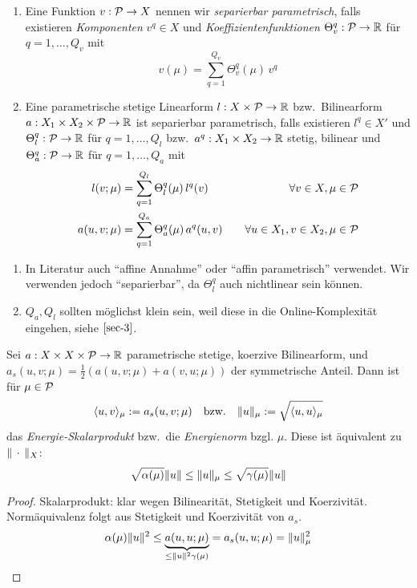 \begin{defn} \beginwithlist
	\begin{enumerate}
		\item Eine Funktion $v : \mathcal{P} \to X$ nennen wir \emph{separierbar parametrisch}, falls existieren \emph{Komponenten} $v^q \in X$ und \emph{Koeffizientenfunktionen} $\Theta_v^q : \mathcal{P} \to \mathbb{R}$ für $q = 1,\dots,Q_v$ mit
			\[
				v(\mu) = \sum_{q=1}^{Q_v} \Theta_v^q(\mu) \, v^q
			\]
		\item Eine parametrische stetige Linearform $l : X \times \mathcal{P} \to \mathbb{R}$ bzw.\ Bilinearform $a : X_1 \times X_2 \times \mathcal{P} \to \mathbb{R}$ ist separierbar parametrisch, falls existieren $l^q \in X'$ und $\Theta_l^q : \mathcal{P} \to \mathbb{R}$ für $q = 1,\dots,Q_l$ bzw.\ $a^q : X_1 \times X_2 \to \mathbb{R}$ stetig, bilinear und $\Theta_a^q : \mathcal{P} \to \mathbb{R}$ für $q = 1,\dots,Q_a$ mit
			\begin{align*}
				l(v;\mu) &= \sum_{q=1}^{Q_l} \Theta_l^q(\mu) \, l^q(v) \quad &\forall v \in X, \mu \in \mathcal{P}\\
				a(u,v;\mu) &= \sum_{q=1}^{Q_a} \Theta_a^q(\mu) \, a^q(u,v) \quad &\forall u \in X_1, v \in X_2, \mu \in \mathcal{P}
			\end{align*}
	\end{enumerate}
\end{defn}

\begin{bem} \beginwithlistbem
	\begin{enumerate}
		\item In Literatur auch ``affine Annahme'' oder ``affin parametrisch'' verwendet.
			Wir verwenden jedoch ``separierbar'', da $\Theta_l^q$ auch nichtlinear sein können.
		\item $Q_a, Q_l$ sollten möglichst klein sein, weil diese in die Online-Komplexität eingehen, siehe $\ref{sec-3}$.
	\end{enumerate}
\end{bem}

\begin{satz}[Energienorm]
	Sei $a : X \times X \times \mathcal{P} \to \mathbb{R}$ parametrische stetige, koerzive Bilinearform, und $a_s(u,v;\mu) = \frac 1 2 (a(u,v;\mu)+a(v,u;\mu))$ der symmetrische Anteil.
	Dann ist für $\mu \in \mathcal{P}$
	\[
		\langle u, v \rangle_\mu := a_s(u,v;\mu) \quad \text{bzw.} \quad \|u\|_\mu := \sqrt{\langle u, u \rangle_\mu}
	\]
	das \emph{Energie-Skalarprodukt} bzw.\ die \emph{Energienorm} bzgl. $\mu$. Diese ist äquivalent zu $\|\,\cdot\,\|_X$:
	\[
		\sqrt{\alpha(\mu)} \|u\| \leq \|u\|_\mu \leq \sqrt{\gamma(\mu)} \|u\|
	\]

	\begin{proof}
		Skalarprodukt: klar wegen Bilinearität, Stetigkeit und Koerzivität.
		Normäquivalenz folgt aus Stetigkeit und Koerzivität von $a_s$.
		\[
			\alpha(\mu) \|u\|^2 \leq \underbrace{a(u,u;\mu)}_{\leq \|u\|^2 \gamma(\mu)} = a_s(u,u;\mu) = \|u\|_\mu^2
		\]
	\end{proof}
\end{satz}

